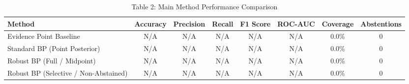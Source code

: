 \begin{table}[htbp]
\centering
\caption{Table 2: Main Method Performance Comparison}
\label{tab:table2_main_method_comparison}
\begin{tabular}{lccccccc}
\hline
Method & Accuracy & Precision & Recall & F1 Score & ROC-AUC & Coverage & Abstentions \\
\hline
Evidence Point Baseline & N/A & N/A & N/A & N/A & N/A & 0.0\% & 0 \\
Standard BP (Point Posterior) & N/A & N/A & N/A & N/A & N/A & 0.0\% & 0 \\
Robust BP (Full / Midpoint) & N/A & N/A & N/A & N/A & N/A & 0.0\% & 0 \\
Robust BP (Selective / Non-Abstained) & N/A & N/A & N/A & N/A & N/A & 0.0\% & 0 \\
\hline
\end{tabular}
\end{table}